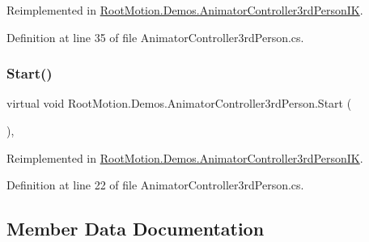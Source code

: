 Reimplemented in \mbox{\hyperlink{class_root_motion_1_1_demos_1_1_animator_controller3rd_person_i_k_a0aad38e138a483b9dc302735016d6138}{Root\+Motion.\+Demos.\+Animator\+Controller3rd\+Person\+IK}}.



Definition at line 35 of file Animator\+Controller3rd\+Person.\+cs.

\mbox{\label{class_root_motion_1_1_demos_1_1_animator_controller3rd_person_a3cc5803cad79ca0633394decf1495f16}} 
\subsubsection{\texorpdfstring{Start()}{Start()}}
{\footnotesize\ttfamily virtual void Root\+Motion.\+Demos.\+Animator\+Controller3rd\+Person.\+Start (\begin{DoxyParamCaption}{ }\end{DoxyParamCaption})\hspace{0.3cm}{\ttfamily [protected]}, {\ttfamily [virtual]}}



Reimplemented in \mbox{\hyperlink{class_root_motion_1_1_demos_1_1_animator_controller3rd_person_i_k_a2da8e38a44df44d929d59242cf3fb44a}{Root\+Motion.\+Demos.\+Animator\+Controller3rd\+Person\+IK}}.



Definition at line 22 of file Animator\+Controller3rd\+Person.\+cs.



\subsection{Member Data Documentation}
\mbox{\label{class_root_motion_1_1_demos_1_1_animator_controller3rd_person_a547b89739de8d629e509b70e0172d295}} 
